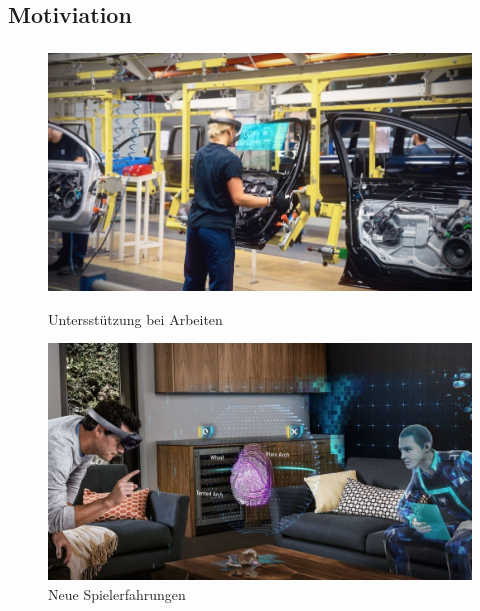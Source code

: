 \documentclass{beamer}
\begin{document}
\subsection{Motiviation}
\begin{frame}
    \frametitle{\insertsubsection} 
    \begin{figure}
        \centering
        \begin{minipage}{.5\textwidth}
            \centering
            \includegraphics[width=.9\linewidth]{images/HololensUsecaseCar}
            \caption{Untersstützung bei Arbeiten~\cite{HoloLensVolvo:3ZnwAVSG}}
        \end{minipage}%
        \begin{minipage}{.5\textwidth}
            \centering
            \includegraphics[width=.9\linewidth]{images/HololensUsecaseGame}
            \caption{Neue Spielerfahrungen~\cite{HoloLensFractions:qf6SMVOm}}            
        \end{minipage}
    \end{figure}  


\end{frame}
\end{document}
